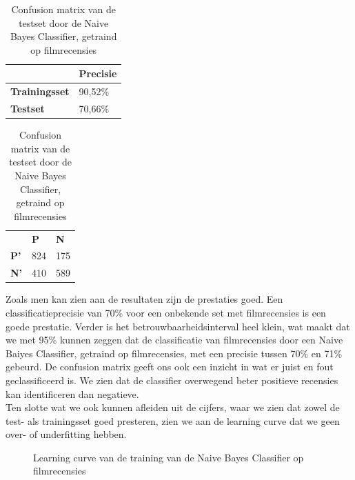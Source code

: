 \begin{appendices}
\begin{table}[h]
\centering
\setlength\tabcolsep{4pt}
\begin{minipage}[t]{0.48\textwidth}
\centering
\begin{tabular}{l|l|}
\cline{2-2}
                                            & \textbf{Precisie} \\ \hline
\multicolumn{1}{|l|}{\textbf{Trainingsset}} & 90,52\%           \\ \hline
\multicolumn{1}{|l|}{\textbf{Testset}}      & 70,66\%           \\ \hline
\end{tabular}
\caption{Classificatieprecisie Naive Bayes Classifier, getraind op filmrecensies}
\label{tab:movie-movie}
\end{minipage}%
\hfill
\begin{minipage}[t]{0.48\textwidth}
\centering
\begin{tabular}{lll}
                                 & \textbf{P}               & \textbf{N}               \\ \cline{2-3} 
\multicolumn{1}{l|}{\textbf{P'}} & \multicolumn{1}{l|}{824} & \multicolumn{1}{l|}{175} \\ \cline{2-3} 
\multicolumn{1}{l|}{\textbf{N'}} & \multicolumn{1}{l|}{410} & \multicolumn{1}{l|}{589} \\ \cline{2-3} 
\end{tabular}
\caption{Confusion matrix van de testset door de  Naive Bayes Classifier, getraind op filmrecensies} 
\label{tab:cm-movie-movie} 
\end{minipage}
\end{table}

Zoals men kan zien aan de resultaten zijn de prestaties goed. Een classificatieprecisie van 70\% voor een onbekende set met filmrecensies is een goede prestatie. Verder is het betrouwbaarheidsinterval heel klein, wat maakt dat we met 95\% kunnen zeggen dat de classificatie van filmrecensies door een Naive Baiyes Classifier, getraind op filmrecensies, met een precisie tussen 70\% en 71\% gebeurd. De confusion matrix geeft ons  ook een inzicht in wat er juist en fout geclassificeerd is. We zien dat de classifier overwegend beter positieve recensies kan identificeren dan negatieve.\\
%
Ten slotte wat we ook kunnen afleiden uit de cijfers, waar we zien dat zowel de test- als trainingsset goed presteren, zien we aan de learning curve dat we geen over- of underfitting hebben. 

\begin{figure}[h]%
    \centering
    \label{fig:lc-movie-movie}
    \caption{Learning curve van de training van de Naive Bayes Classifier op filmrecensies}
\end{figure}


\end{appendices}
